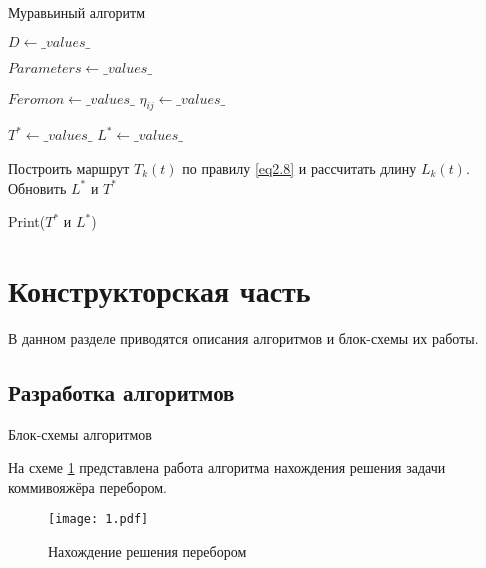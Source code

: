 \documentclass[12pt,a4paper]{scrartcl}
\begin{document}
\begin{algorithm}
\caption{Муравьиный алгоритм}\label{alg:Ants}
\begin{algorithmic}[1]
 
 \State $D \gets \_values\_$
 
 \State $Parameters \gets \_values\_$
 
 \State $Feromon \gets \_values\_$
 \State $η_{ij} \gets \_values\_$
 
 \State $T^* \gets \_values\_$
 \State $L^* \gets \_values\_$
 
\State Построить маршрут $T_k(t)$ по правилу \ref{eq2.8} и рассчитать длину $L_k(t)$.
\EndFor
{}
\State Обновить $L^*$ и $T^*$
\EndIf
{}
\EndFor
\EndFor

\State Print($T^*$ и $L^*$) 
 
\end{algorithmic}
\end{algorithm}
 

 \clearpage
\section{Конструкторская часть}

В данном разделе приводятся описания алгоритмов и блок-схемы их работы.

\subsection{Разработка алгоритмов}

Блок-схемы алгоритмов

На схеме \ref{graph2.4} представлена работа алгоритма нахождения решения задачи коммивояжёра перебором.

\begin{figure}[h!]
	\centering
	\texttt{[image: 1.pdf]}
	\caption{Нахождение решения перебором}
	\label{graph2.4}
\end{figure}
\end{document}
